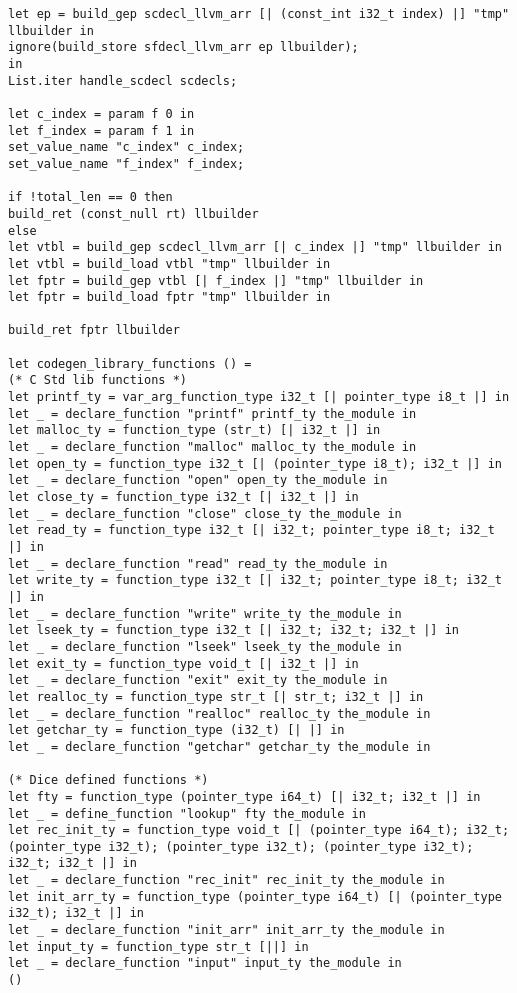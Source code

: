 \begin{verbatim}
let ep = build_gep scdecl_llvm_arr [| (const_int i32_t index) |] "tmp" llbuilder in
ignore(build_store sfdecl_llvm_arr ep llbuilder);
in
List.iter handle_scdecl scdecls;

let c_index = param f 0 in
let f_index = param f 1 in
set_value_name "c_index" c_index;
set_value_name "f_index" f_index;

if !total_len == 0 then
build_ret (const_null rt) llbuilder
else
let vtbl = build_gep scdecl_llvm_arr [| c_index |] "tmp" llbuilder in
let vtbl = build_load vtbl "tmp" llbuilder in
let fptr = build_gep vtbl [| f_index |] "tmp" llbuilder in
let fptr = build_load fptr "tmp" llbuilder in

build_ret fptr llbuilder 

let codegen_library_functions () = 
(* C Std lib functions *)
let printf_ty = var_arg_function_type i32_t [| pointer_type i8_t |] in
let _ = declare_function "printf" printf_ty the_module in
let malloc_ty = function_type (str_t) [| i32_t |] in
let _ = declare_function "malloc" malloc_ty the_module in
let open_ty = function_type i32_t [| (pointer_type i8_t); i32_t |] in 
let _ = declare_function "open" open_ty the_module in
let close_ty = function_type i32_t [| i32_t |] in
let _ = declare_function "close" close_ty the_module in
let read_ty = function_type i32_t [| i32_t; pointer_type i8_t; i32_t |] in
let _ = declare_function "read" read_ty the_module in
let write_ty = function_type i32_t [| i32_t; pointer_type i8_t; i32_t |] in
let _ = declare_function "write" write_ty the_module in 
let lseek_ty = function_type i32_t [| i32_t; i32_t; i32_t |] in
let _ = declare_function "lseek" lseek_ty the_module in
let exit_ty = function_type void_t [| i32_t |] in
let _ = declare_function "exit" exit_ty the_module in
let realloc_ty = function_type str_t [| str_t; i32_t |] in
let _ = declare_function "realloc" realloc_ty the_module in
let getchar_ty = function_type (i32_t) [| |] in
let _ = declare_function "getchar" getchar_ty the_module in

(* Dice defined functions *)
let fty = function_type (pointer_type i64_t) [| i32_t; i32_t |] in
let _ = define_function "lookup" fty the_module in
let rec_init_ty = function_type void_t [| (pointer_type i64_t); i32_t; (pointer_type i32_t); (pointer_type i32_t); (pointer_type i32_t); i32_t; i32_t |] in
let _ = declare_function "rec_init" rec_init_ty the_module in
let init_arr_ty = function_type (pointer_type i64_t) [| (pointer_type i32_t); i32_t |] in
let _ = declare_function "init_arr" init_arr_ty the_module in
let input_ty = function_type str_t [||] in
let _ = declare_function "input" input_ty the_module in
()


\end{verbatim}
